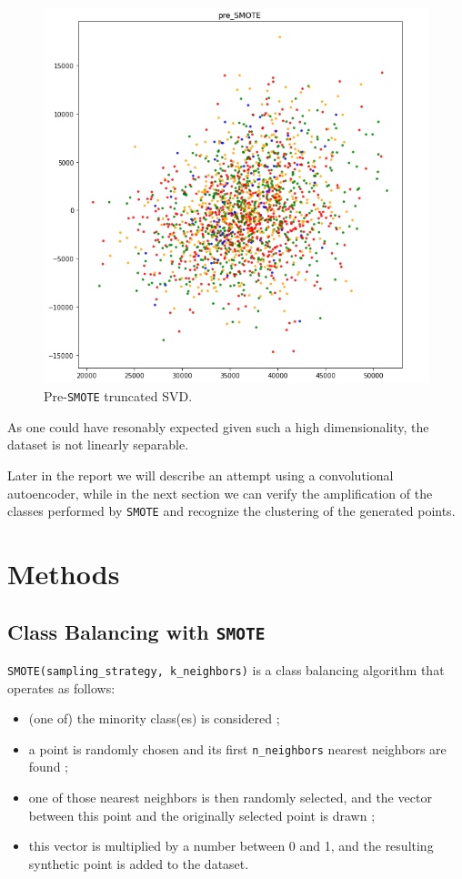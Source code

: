 \documentclass[aps,twocolumn,secnumarabic,nobalancelastpage,amsmath,amssymb,
nofootinbib]{revtex4}
\begin{document}
\begin{figure}
	\centering
	\includegraphics[width=0.7\linewidth]{Images/TruncatedSVD_preSMOTE}
	\caption{Pre-\texttt{SMOTE} truncated SVD.}
	\label{fig:pre-smote}
\end{figure}


As one could have resonably expected given such a high dimensionality,
the dataset is not linearly separable.

Later in the report we will describe an attempt using a
convolutional autoencoder, while in the next
section we can verify the amplification of the classes performed by
\texttt{SMOTE} and recognize the clustering of the generated points.

\section{Methods}\label{methods}


\subsection{Class Balancing with
		\texttt{SMOTE}\label{smote}}

\texttt{SMOTE(sampling\_strategy,\ k\_neighbors)} is a class balancing
algorithm that operates as follows:

\begin{itemize}

\item
(one of) the minority class(es) is considered ;
\vspace{-0.2cm}\item
a point is randomly chosen and its first \texttt{n\_neighbors} nearest
neighbors are found ;
\vspace{-0.2cm}\item
one of those nearest neighbors is then randomly selected, and the
vector between this point and the originally selected point is drawn ;
\vspace{-0.2cm}\item
this vector is multiplied by a number between 0 and 1, and the
resulting synthetic point is added to the dataset.
\end{itemize}
\end{document}
